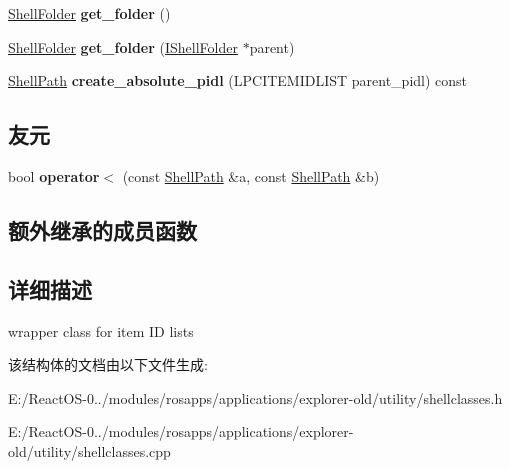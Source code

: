 \begin{DoxyCompactItemize}
\hyperlink{struct_shell_folder}{Shell\+Folder} {\bfseries get\+\_\+folder} ()
\item 
\mbox{\label{struct_shell_path_aacd8f1cd25f86c14f931ff1fdcfab53a}} 
\hyperlink{struct_shell_folder}{Shell\+Folder} {\bfseries get\+\_\+folder} (\hyperlink{interface_i_shell_folder}{I\+Shell\+Folder} $\ast$parent)
\item 
\mbox{\label{struct_shell_path_a0a567e9b5f1a248afaa4117488d76fd3}} 
\hyperlink{struct_shell_path}{Shell\+Path} {\bfseries create\+\_\+absolute\+\_\+pidl} (L\+P\+C\+I\+T\+E\+M\+I\+D\+L\+I\+ST parent\+\_\+pidl) const
\end{DoxyCompactItemize}
\subsection*{友元}
\begin{DoxyCompactItemize}
\item 
\mbox{\label{struct_shell_path_a0a6c893df8c557ce18f0393198c91690}} 
bool {\bfseries operator$<$} (const \hyperlink{struct_shell_path}{Shell\+Path} \&a, const \hyperlink{struct_shell_path}{Shell\+Path} \&b)
\end{DoxyCompactItemize}
\subsection*{额外继承的成员函数}


\subsection{详细描述}
wrapper class for item ID lists 

该结构体的文档由以下文件生成\+:\begin{DoxyCompactItemize}
\item 
E\+:/\+React\+O\+S-\/0../modules/rosapps/applications/explorer-\/old/utility/shellclasses.\+h\item 
E\+:/\+React\+O\+S-\/0../modules/rosapps/applications/explorer-\/old/utility/shellclasses.\+cpp\end{DoxyCompactItemize}
